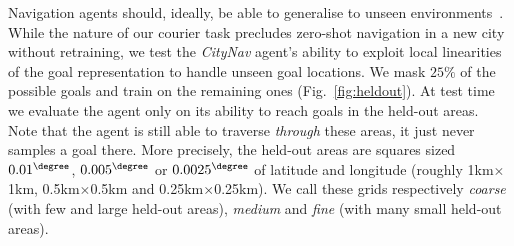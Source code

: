 \begin{figure}[thb]
\begin{floatrow}
\end{floatrow}
\end{figure}



Navigation agents should, ideally, be able to generalise to unseen environments~\cite{dhiman2018critical}. While the nature of our courier task precludes zero-shot navigation in a new city without retraining, we test the \emph{CityNav} agent's ability to exploit local linearities of the goal representation to handle unseen goal locations. We mask $25\%$ of the possible goals and train on the remaining ones (Fig.~\ref{fig:heldout}). At test time we evaluate the agent only on its ability to reach goals in the held-out areas. Note that the agent is still able to traverse \emph{through} these areas, it just never samples a goal there.
More precisely, the held-out areas are squares
sized $0.01^{\degree}$, $0.005^{\degree}$ or $0.0025^{\degree}$ of latitude and longitude (roughly 1km$\times$1km, 0.5km$\times$0.5km and 0.25km$\times$0.25km). We call these grids respectively \emph{coarse} (with few and large held-out areas), \emph{medium} and \emph{fine} (with many small held-out areas).

